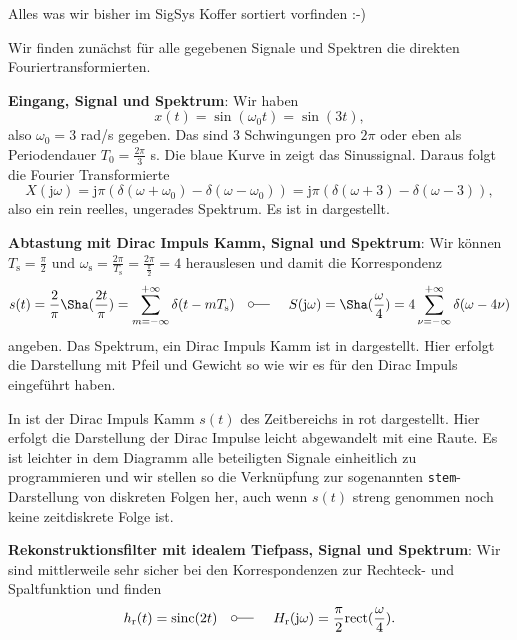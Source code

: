 \begin{Werkzeug}
Alles was wir bisher im SigSys Koffer sortiert vorfinden :-)
\end{Werkzeug}
\begin{Ansatz}
Wir finden zunächst für alle gegebenen Signale und Spektren die direkten
Fouriertransformierten.

\textbf{Eingang, Signal und Spektrum}:
Wir haben
\begin{equation}
x(t) = \sin(\omega_0 t) = \sin(3 t),
\end{equation}
also  $\omega_0=3$ rad/s gegeben. Das sind 3 Schwingungen pro $2\pi$ oder eben
als Periodendauer $T_0 = \frac{2\pi}{3}$ s.
Die blaue Kurve in  zeigt das Sinussignal.
Daraus folgt die Fourier Transformierte
\begin{equation}
X(\mathrm{j} \omega) =
\mathrm{j} \pi \left( \delta(\omega+\omega_0) - \delta(\omega-\omega_0) \right) =
\mathrm{j} \pi \left( \delta(\omega+3) - \delta(\omega-3) \right),
\end{equation}
also ein rein reelles, ungerades Spektrum. Es ist in 
dargestellt.

\textbf{Abtastung mit Dirac Impuls Kamm, Signal und Spektrum}:
Wir können $T_\mathrm{s} = \frac{\pi}{2}$ und
$\omega_\mathrm{s} = \frac{2 \pi}{T_\mathrm{s}} = \frac{2 \pi}{\frac{\pi}{2}} = 4$
herauslesen und damit die Korrespondenz
\begin{equation}
s(t) = \frac{2}{\pi} {\Sha}(\frac{2 t}{\pi}) =
\sum_{m=-\infty}^{+\infty} \delta(t-m T_\mathrm{s})
\quad\fourier\quad
S(\mathrm{j}\omega) = {\Sha}(\frac{\omega}{4}) =
4 \sum_{\nu=-\infty}^{+\infty} \delta(\omega-4 \nu)
\end{equation}
angeben. Das Spektrum, ein Dirac Impuls Kamm ist in 
dargestellt. Hier erfolgt die Darstellung mit Pfeil und Gewicht so wie wir es
für den Dirac Impuls eingeführt haben.

In  ist der Dirac Impuls Kamm $s(t)$ des Zeitbereichs
in rot dargestellt. Hier erfolgt die Darstellung der Dirac Impulse leicht abgewandelt
mit eine Raute. Es ist leichter in dem Diagramm alle beteiligten Signale einheitlich
zu programmieren und wir stellen so die Verknüpfung zur sogenannten
\texttt{stem}-Darstellung von diskreten Folgen her, auch wenn $s(t)$ streng genommen
noch keine zeitdiskrete Folge ist.

\textbf{Rekonstruktionsfilter mit idealem Tiefpass, Signal und Spektrum}:
Wir sind mittlerweile sehr sicher bei den Korrespondenzen zur Rechteck- und
Spaltfunktion und finden
\begin{equation}
h_\mathrm{r}(t) = \mathrm{sinc}(2 t) \quad\fourier\quad
H_\mathrm{r}(\mathrm{j}\omega) = \frac{\pi}{2}\mathrm{rect}(\frac{\omega}{4}).
\end{equation}


\end{Ansatz}
